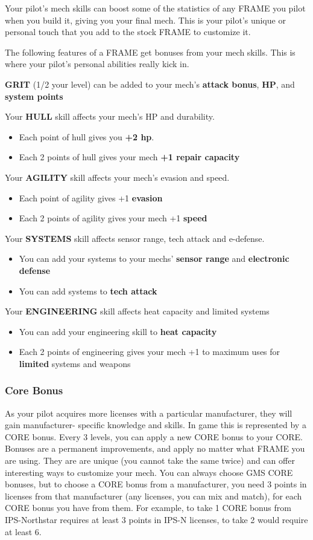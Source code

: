 Your pilot's mech skills can boost some of the statistics of any FRAME you pilot when you build it, giving you your final mech. This is your pilot's unique or personal touch that you add to the stock FRAME to customize it. 

The following features of a FRAME get bonuses from your mech skills. This is where your pilot's personal abilities really kick in. 

\textbf{GRIT} (1/2 your level) can be added to your mech's \textbf{attack bonus}, \textbf{HP}, and \textbf{system points} 


Your \textbf{HULL} skill affects your mech's HP and durability.
\begin{itemize}
\item Each point of hull gives you \textbf{+2 hp}.
\item Each 2 points of hull gives your mech \textbf{+1 repair capacity} 
\end{itemize}
Your \textbf{AGILITY} skill affects your mech's evasion and speed.
\begin{itemize}
\item Each point of agility gives +1 \textbf{evasion} 
\item Each 2 points of agility gives your mech +1 \textbf{speed} 
\end{itemize}
Your \textbf{SYSTEMS} skill affects sensor range, tech attack and e-defense.
\begin{itemize}
\item You can add your systems to your mechs' \textbf{sensor range} and \textbf{electronic defense} 
\item You can add systems to \textbf{tech attack} 
\end{itemize}
Your \textbf{ENGINEERING} skill affects heat capacity and limited systems
\begin{itemize}
\item You can add your engineering skill to \textbf{heat capacity} 
\item Each 2 points of engineering gives your mech +1 to maximum uses for \textbf{limited} systems and weapons
\end{itemize}
       
\subsubsection{Core Bonus}

As your pilot acquires more licenses with a particular manufacturer, they will gain manufacturer- specific knowledge and skills. In game this is represented by a CORE bonus. Every 3 levels, you can apply a new CORE bonus to your CORE. Bonuses are a permanent improvements, and apply no matter what FRAME you are using. They are are unique (you cannot take the same twice) and can offer interesting ways to customize your mech. You can always choose GMS CORE bonuses, but to choose a CORE bonus from a manufacturer, you need 3 points in licenses from that manufacturer (any licenses, you can mix and match), for each CORE bonus you have from them. For example, to take 1 CORE bonus from IPS-Northstar requires at least 3 points in IPS-N licenses, to take 2 would require at least 6.

